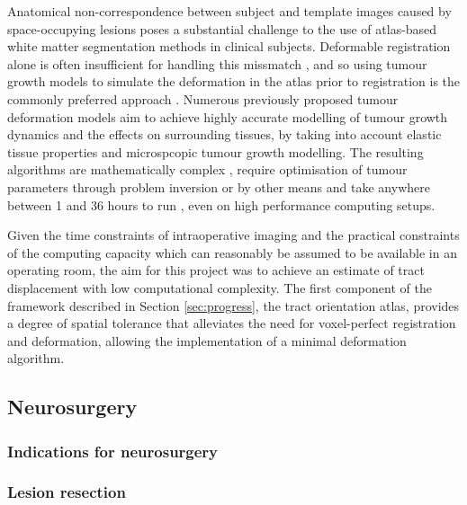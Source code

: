 Anatomical non-correspondence between subject and template images caused by space-occupying lesions poses a substantial challenge to the use of atlas-based white matter segmentation methods in clinical subjects.
Deformable registration alone is often insufficient for handling this missmatch \autocite{Elazab2018, Visser2020}, and so using tumour growth models to simulate the deformation in the atlas prior to registration is the commonly preferred approach \autocite{Cabezas2011, Mang2020}.
Numerous previously proposed tumour deformation models aim to achieve highly accurate modelling of tumour growth dynamics and the effects on surrounding tissues, by taking into account elastic tissue properties and microspcopic tumour growth modelling.
The resulting algorithms are mathematically complex \autocite{Elazab2018}, require optimisation of tumour parameters through problem inversion or by other means \autocite{Mohamed2006, Zacharaki2009, Mang2020} and take anywhere between 1 and 36 hours to run \autocite{Zacharaki2009,Bauer2012, Bauer2013,Mang2012}, even on high performance computing setups.

Given the time constraints of intraoperative imaging and the practical constraints of the computing capacity which can reasonably be assumed to be available in an operating room, the aim for this project was to achieve an estimate of tract displacement with low computational complexity.
The first component of the framework described in Section \ref{sec:progress}, the tract orientation atlas, provides a degree of spatial tolerance that alleviates the need for voxel-perfect registration and deformation, allowing the implementation of a minimal deformation algorithm.

\subsection{Neurosurgery}

\subsubsection{Indications for neurosurgery}


\subsubsection{Lesion resection}

